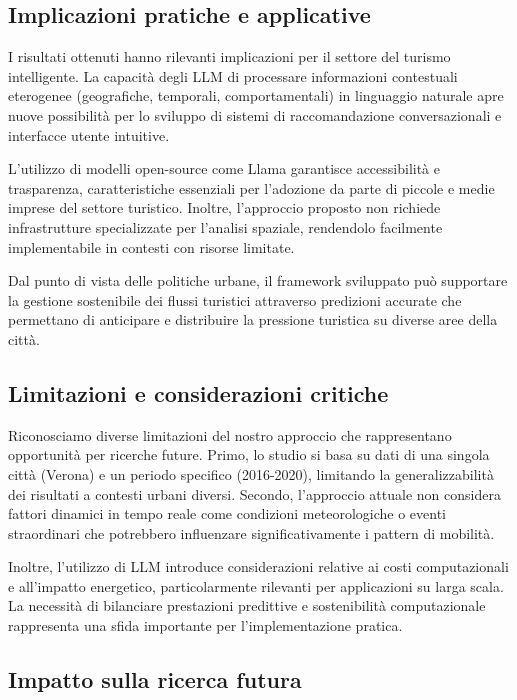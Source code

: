 \subsection{Implicazioni pratiche e applicative}

I risultati ottenuti hanno rilevanti implicazioni per il settore del turismo intelligente. La capacità degli LLM di processare informazioni contestuali eterogenee (geografiche, temporali, comportamentali) in linguaggio naturale apre nuove possibilità per lo sviluppo di sistemi di raccomandazione conversazionali e interfacce utente intuitive.

L'utilizzo di modelli open-source come Llama garantisce accessibilità e trasparenza, caratteristiche essenziali per l'adozione da parte di piccole e medie imprese del settore turistico. Inoltre, l'approccio proposto non richiede infrastrutture specializzate per l'analisi spaziale, rendendolo facilmente implementabile in contesti con risorse limitate.

Dal punto di vista delle politiche urbane, il framework sviluppato può supportare la gestione sostenibile dei flussi turistici attraverso predizioni accurate che permettano di anticipare e distribuire la pressione turistica su diverse aree della città.

\subsection{Limitazioni e considerazioni critiche}

Riconosciamo diverse limitazioni del nostro approccio che rappresentano opportunità per ricerche future. Primo, lo studio si basa su dati di una singola città (Verona) e un periodo specifico (2016-2020), limitando la generalizzabilità dei risultati a contesti urbani diversi. Secondo, l'approccio attuale non considera fattori dinamici in tempo reale come condizioni meteorologiche o eventi straordinari che potrebbero influenzare significativamente i pattern di mobilità.

Inoltre, l'utilizzo di LLM introduce considerazioni relative ai costi computazionali e all'impatto energetico, particolarmente rilevanti per applicazioni su larga scala. La necessità di bilanciare prestazioni predittive e sostenibilità computazionale rappresenta una sfida importante per l'implementazione pratica.

\subsection{Impatto sulla ricerca futura}

